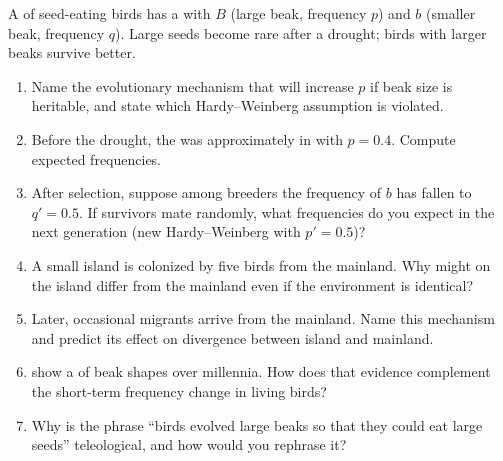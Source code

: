 \begin{problem}\label{pb:g11:evolution-mechanisms:1}
A  of seed-eating birds has a  with  $B$ (large beak,
frequency $p$) and $b$ (smaller beak, frequency $q$). Large seeds become rare
after a drought; birds with larger beaks survive better.
\begin{enumerate}
  \item Name the evolutionary mechanism that will increase $p$ if beak size is
        heritable, and state which Hardy--Weinberg assumption is violated.
  \item Before the drought, the  was approximately in  with $p = 0.4$. Compute expected  frequencies.
  \item After selection, suppose among breeders the frequency of $b$ has fallen
        to $q' = 0.5$. If survivors mate randomly, what  frequencies do
        you expect in the next generation (new Hardy--Weinberg with $p' = 0.5$)?
  \item A small island is colonized by five birds from the mainland. Why might
         on the island differ from the mainland even if the
        environment is identical?
  \item Later, occasional migrants arrive from the mainland. Name this mechanism
        and predict its effect on divergence between island and mainland.
  \item {} show a  of beak shapes over millennia. How does that
        evidence complement the short-term frequency change in living birds?
  \item Why is the phrase ``birds evolved large beaks so that they could eat
        large seeds'' teleological, and how would you rephrase it?
\end{enumerate}
\end{problem}
